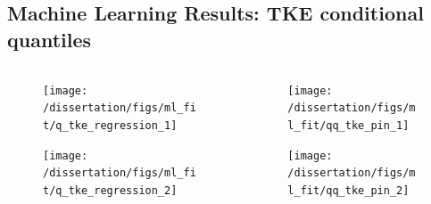 \documentclass[t, pdftex]{beamer}
\begin{document}
\subsection*{Machine Learning Results: TKE conditional quantiles}
\begin{frame}
\vspace{-33pt}
\begin{columns}
    \begin{column}{0.5\textwidth}
        \begin{figure}[H]%
            \texttt{[image: /dissertation/figs/ml\_fit/q\_tke\_regression\_1]}
        \end{figure}
        \vspace{-26pt}
        \begin{figure}[H]%
            \texttt{[image: /dissertation/figs/ml\_fit/q\_tke\_regression\_2]}
        \end{figure}
    \end{column}
    \begin{column}{0.5\textwidth}
        \begin{figure}[H]%
            \texttt{[image: /dissertation/figs/ml\_fit/qq\_tke\_pin\_1]}
        \end{figure}
        \vspace{-26pt}
        \begin{figure}[H]%
            \texttt{[image: /dissertation/figs/ml\_fit/qq\_tke\_pin\_2]}
        \end{figure}
    \end{column}
\end{columns}
\end{frame}

\end{document}
